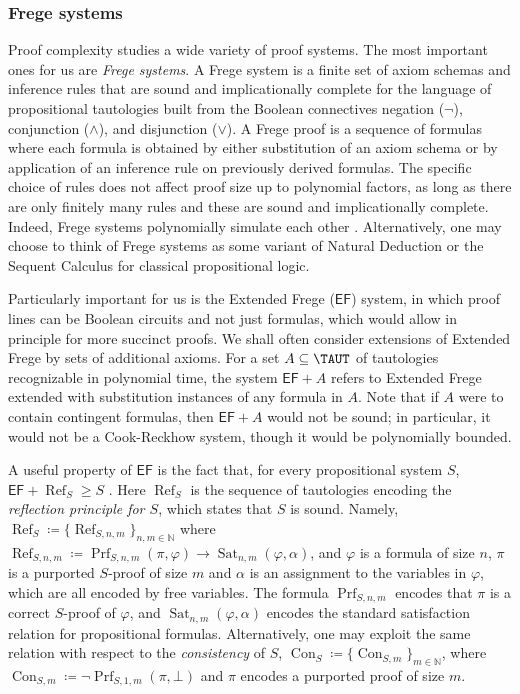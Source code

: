 \documentclass[11pt]{article}
\newcommand{\EF}{\mathsf{EF}}
\theoremstyle{definition}
\theoremstyle{plain}
\theoremstyle{remark}
\begin{document}
\subsubsection{Frege systems}
\label{subsec:proof-complexity-ref}
Proof complexity studies a wide variety of proof systems. The most important ones for us are \emph{Frege systems}. A Frege system is a finite set of axiom schemas and inference rules that are sound and implicationally complete for the language of propositional tautologies built from the Boolean connectives negation ($\neg$), conjunction ($\land$), and disjunction ($\lor$). A Frege proof is a sequence of formulas where each formula is obtained by either substitution of an axiom schema or by application of an inference rule on previously derived formulas. The specific choice of rules does not affect proof size up to polynomial factors, as long as there are only finitely many rules and these are sound and implicationally complete. Indeed, Frege systems polynomially simulate each other \autocite[Thm. 4.4.13]{krajicekBOOK}. Alternatively, one may choose to think of Frege systems as some variant of Natural Deduction or the Sequent Calculus for classical propositional logic.

Particularly important for us is the Extended Frege ($\EF$) system, in which proof lines can be Boolean circuits and not just formulas, which would allow in principle for more succinct proofs. We shall often consider extensions of Extended Frege by sets of additional axioms. For a set $A \subseteq \TAUT$ of tautologies recognizable in polynomial time, the system $\EF + A$ refers to Extended Frege extended with substitution instances of any formula in $A$. Note that if $A$ were to contain contingent formulas, then $\EF + A$ would not be sound; in particular, it would not be a Cook-Reckhow system, though it would be polynomially bounded.

A useful property of $\EF$ is the fact that, for every propositional system $S$, $\EF + \operatorname{Ref}_S \geq S$ \cite{KP90}. Here $\operatorname{Ref}_S$ is the sequence of tautologies encoding the \emph{reflection principle for $S$}, which states that $S$ is sound. Namely, $\operatorname{Ref}_S \coloneqq \{\operatorname{Ref}_{S, n, m}\}_{n, m \in \mathbb{N}}$ where
$\operatorname{Ref}_{S, {n, m}} \coloneqq \operatorname{Prf}_{S, n, m}(\pi, \varphi) \to \operatorname{Sat}_{n, m}(\varphi, \alpha)$,
and $\varphi$ is a formula of size $n$, $\pi$ is a purported $S$-proof of size $m$ and $\alpha$ is an assignment to the variables in $\varphi$, which are all encoded by free variables. The formula $\operatorname{Prf}_{S, n, m}$ encodes that $\pi$ is a correct $S$-proof of $\varphi$, and $\operatorname{Sat}_{n, m}(\varphi, \alpha)$ encodes the standard satisfaction relation for propositional formulas. Alternatively, one may exploit the same relation with respect to the \emph{consistency} of $S$, $\operatorname{Con}_S \coloneqq \{\operatorname{Con}_{S, m}\}_{m \in \mathbb{N}}$, where $\operatorname{Con}_{S, m} \coloneqq \neg \operatorname{Prf}_{S,1, m}(\pi, \bot)$ and $\pi$ encodes a purported proof of size $m$.
\end{document}
